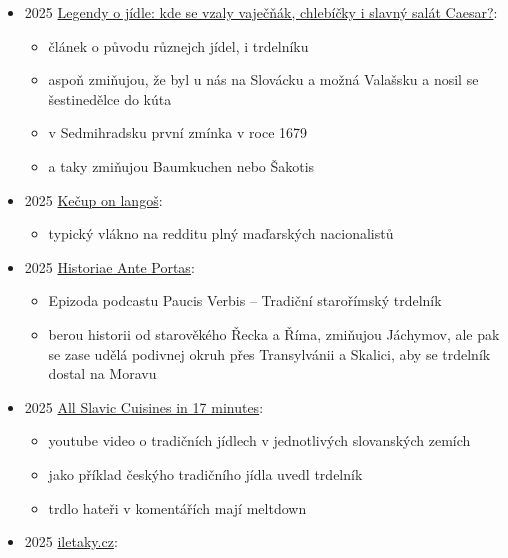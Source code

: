 \begin{itemize}
  \begin{itemize}
  \tightlist
  \item
    recept a diskutujou kontroverze o původu trdelníku, jejich závěr je,
    že to je prostě středoevropský jídlo
  \end{itemize}
\item
  2025
  \href{https://www.apetitonline.cz/zajimavosti/legendy-o-jidle-vajecnak-chlebicky-caesar}{Legendy
  o jídle: kde se vzaly vaječňák, chlebíčky i slavný salát Caesar?}:

  \begin{itemize}
  \tightlist
  \item
    článek o původu různejch jídel, i trdelníku
  \item
    aspoň zmiňujou, že byl u nás na Slovácku a možná Valašsku a nosil se
    šestinedělce do kúta
  \item
    v Sedmihradsku první zmínka v roce 1679
  \item
    a taky zmiňujou Baumkuchen nebo Šakotis
  \end{itemize}
\item
  2025
  \href{https://www.reddit.com/r/2visegrad4you/comments/1o5mk4j/ke\%C4\%8Dup_on_lango\%C5\%A1/}{Kečup
  on langoš}:

  \begin{itemize}
  \tightlist
  \item
    typický vlákno na redditu plný maďarských nacionalistů
  \end{itemize}
\item
  2025
  \href{https://open.spotify.com/episode/7IwKL0YYYv16LcGNDMApiA}{Historiae
  Ante Portas}:

  \begin{itemize}
  \tightlist
  \item
    Epizoda podcastu Paucis Verbis -- Tradiční starořímský trdelník
  \item
    berou historii od starověkého Řecka a Říma, zmiňujou Jáchymov, ale
    pak se zase udělá podivnej okruh přes Transylvánii a Skalici, aby se
    trdelník dostal na Moravu
  \end{itemize}
\item
  2025
  \href{https://www.youtube.com/watch?v=iWU8810_PKQ&lc=UgyBhHfX5xOcJr0Chfd4AaABAg}{All
  Slavic Cuisines in 17 minutes}:

  \begin{itemize}
  \tightlist
  \item
    youtube video o tradičních jídlech v jednotlivých slovanských zemích
  \item
    jako příklad českýho tradičního jídla uvedl trdelník
  \item
    trdlo hateři v komentářích mají meltdown
  \end{itemize}
\item
  2025
  \href{https://www.iletaky.cz/magazin/jednoduchy-domaci-trdelnik-z-trouby-stoji-par-korun-a-provoni-cely-byt}{iletaky.cz}:


\end{itemize}
